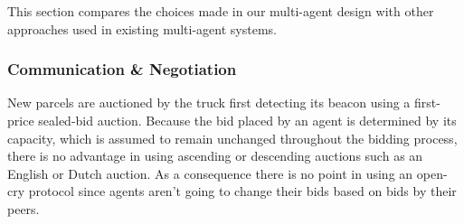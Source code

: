 \documentclass[../main.tex]{subfiles}
\begin{document}
This section compares the choices made in our multi-agent design with other approaches used in existing multi-agent systems.

\subsubsection{Communication \& Negotiation}
New parcels are auctioned by the truck first detecting its beacon using a first-price sealed-bid auction. Because the bid placed by an agent is determined by its capacity, which is assumed to remain unchanged throughout the bidding process, there is no advantage in using ascending or descending auctions such as an English or Dutch auction. As a consequence there is no point in using an open-cry protocol since agents aren't going to change their bids based on bids by their peers.
\end{document}
